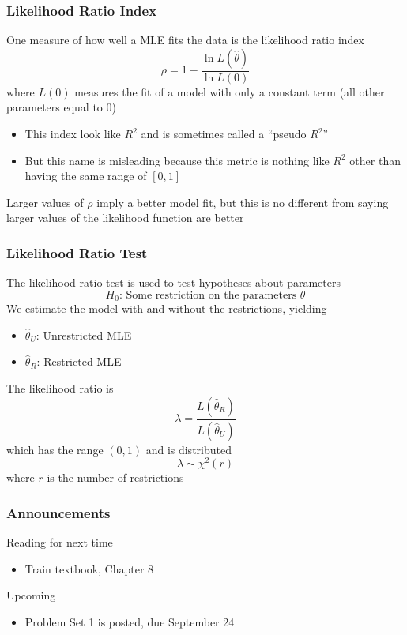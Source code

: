 \documentclass{beamer}
\begin{document}
\begin{frame}\frametitle{Likelihood Ratio Index}
    One measure of how well a MLE fits the data is the likelihood ratio index
    $$\rho = 1 - \frac{\ln L(\hat{\theta})}{\ln L(0)}$$
    where $L(0)$ measures the fit of a model with only a constant term (all other parameters equal to 0)
    \begin{itemize}
        \item This index look like $R^2$ and is sometimes called a ``pseudo $R^2$''
        \item But this name is misleading because this metric is nothing like $R^2$ other than having the same range of $[0, 1]$
    \end{itemize}
    \vspace{2ex}
    Larger values of $\rho$ imply a better model fit, but this is no different from saying larger values of the likelihood function are better
\end{frame}

\begin{frame}\frametitle{Likelihood Ratio Test}
    The likelihood ratio test is used to test hypotheses about parameters
    $$H_0 \text{: Some restriction on the parameters } \theta$$
    We estimate the model with and without the restrictions, yielding
    \begin{itemize}
        \item $\hat{\theta}_U$: Unrestricted MLE
        \item $\hat{\theta}_R$: Restricted MLE
    \end{itemize}
    \vspace{2ex}
    The likelihood ratio is
    $$\lambda = \frac{L(\hat{\theta}_R)}{L(\hat{\theta}_U)}$$
    which has the range $(0, 1)$ and is distributed
    $$\lambda \sim \chi^2(r)$$
    where $r$ is the number of restrictions
\end{frame}

\begin{frame}\frametitle{Announcements}
    Reading for next time
    \begin{itemize}
        \item Train textbook, Chapter 8
    \end{itemize}
    \vspace{3ex}
    Upcoming
    \begin{itemize}
        \item Problem Set 1 is posted, due September 24
    \end{itemize}
\end{frame}
\end{document}
